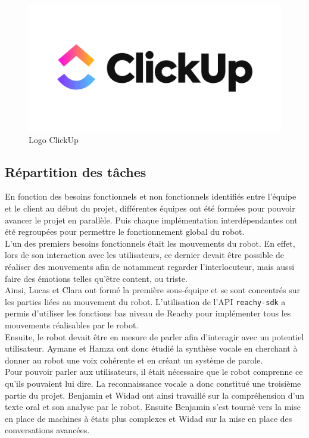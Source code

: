 \documentclass[a4paper,french]{article}
\begin{document}
\begin{figure}[H]
    \centering
    \includegraphics[scale=0.2]{figures/clickup-logo.png}
    \caption{Logo ClickUp}
\end{figure}

\subsection{Répartition des tâches}
En fonction des besoins fonctionnels et non fonctionnels identifiés entre l'équipe et le client au début du projet, différentes équipes ont été formées pour pouvoir avancer le projet en parallèle. Puis chaque implémentation interdépendantes ont été regroupées pour permettre le fonctionnement global du robot. \\

L'un des premiers besoins fonctionnels était les mouvements du robot. En effet, lors de son interaction avec les utilisateurs, ce dernier devait être possible de réaliser des mouvements afin de notamment regarder l'interlocuteur, mais aussi faire des émotions telles qu'être content, ou triste. \\

Ainsi, Lucas et Clara ont formé la première sous-équipe et se sont concentrés sur les parties liées au mouvement du robot. L'utilisation de l'API \texttt{reachy-sdk} a permis d'utiliser les fonctions bas niveau de Reachy pour implémenter tous les mouvements réalisables par le robot. \\

Ensuite, le robot devait être en mesure de parler afin d'interagir avec un potentiel utilisateur. Aymane et Hamza ont donc étudié la synthèse vocale en cherchant à donner au robot une voix cohérente et en créant un système de parole. \\

Pour pouvoir parler aux utilisateurs, il était nécessaire que le robot comprenne ce qu'ils pouvaient lui dire. La reconnaissance vocale a donc constitué une troisième partie du projet. Benjamin et Widad ont ainsi travaillé sur la compréhension d'un texte oral et son analyse par le robot. Ensuite Benjamin s'est tourné vers la mise en place de machines à états plus complexes et Widad sur la mise en place des conversations avancées. \\
\end{document}
